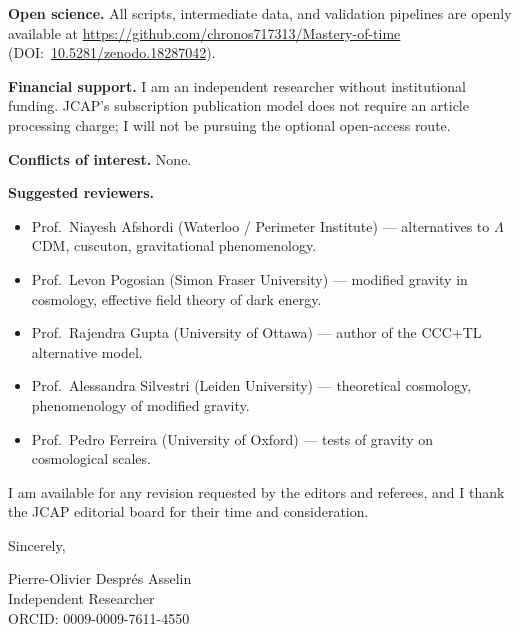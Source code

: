 \documentclass[12pt]{article}
\begin{document}
\bigskip

\textbf{Open science.}
All scripts, intermediate data, and validation pipelines are openly
available at
\url{https://github.com/chronos717313/Mastery-of-time}
(DOI:~\href{https://doi.org/10.5281/zenodo.18287042}{10.5281/zenodo.18287042}).

\bigskip

\textbf{Financial support.}
I am an independent researcher without institutional funding. JCAP's
subscription publication model does not require an article processing
charge; I will not be pursuing the optional open-access route.

\bigskip

\textbf{Conflicts of interest.}
None.

\bigskip

\textbf{Suggested reviewers.}
\begin{itemize}
  \item Prof.\ Niayesh Afshordi (Waterloo / Perimeter Institute) ---
    alternatives to $\Lambda$CDM, cuscuton, gravitational phenomenology.
  \item Prof.\ Levon Pogosian (Simon Fraser University) --- modified
    gravity in cosmology, effective field theory of dark energy.
  \item Prof.\ Rajendra Gupta (University of Ottawa) --- author of the
    CCC+TL alternative model.
  \item Prof.\ Alessandra Silvestri (Leiden University) --- theoretical
    cosmology, phenomenology of modified gravity.
  \item Prof.\ Pedro Ferreira (University of Oxford) --- tests of
    gravity on cosmological scales.
\end{itemize}

\bigskip

I am available for any revision requested by the editors and referees,
and I thank the JCAP editorial board for their time and consideration.

\bigskip

Sincerely,

\bigskip

\noindent
Pierre-Olivier Despr\'{e}s Asselin \\
Independent Researcher \\
ORCID: 0009-0009-7611-4550
\end{document}
